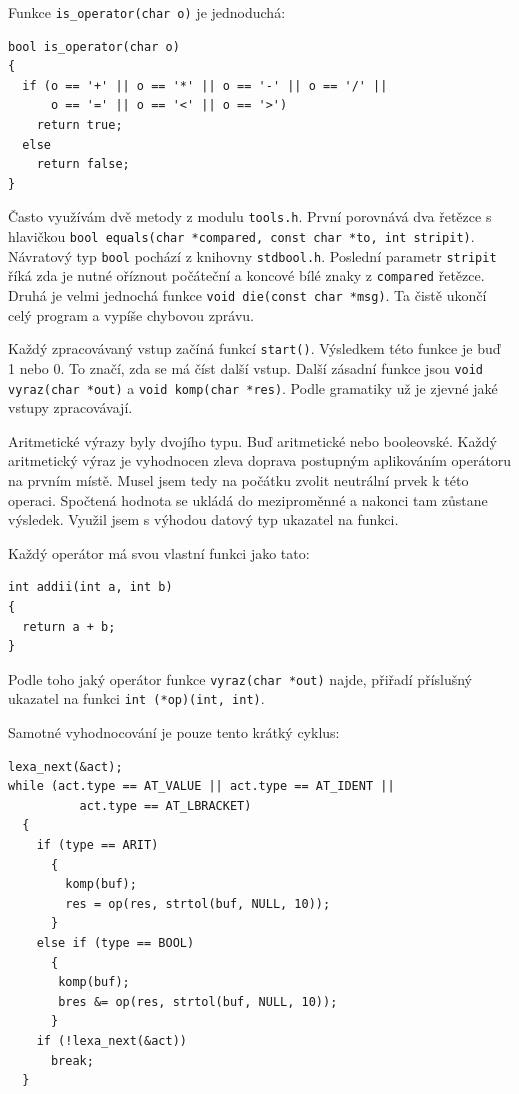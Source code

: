 \documentclass{article}
\begin{document}
Funkce \texttt{is\_operator(char o)} je jednoduchá:

\begin{lstlisting}
bool is_operator(char o)
{
  if (o == '+' || o == '*' || o == '-' || o == '/' ||
      o == '=' || o == '<' || o == '>')
    return true;
  else
    return false;
}
\end{lstlisting}

Často využívám dvě metody z modulu \texttt{tools.h}. První porovnává
dva řetězce s hlavičkou
\verb+bool equals(char *compared, const char *to, int stripit)+. Návratový
typ \texttt{bool} pochází z knihovny \texttt{stdbool.h}.
Poslední parametr \texttt{stripit} říká zda je nutné oříznout
počáteční a koncové bílé znaky z \texttt{compared} řetězce.
Druhá je velmi jednochá funkce \verb+void die(const char *msg)+. Ta čistě
ukončí celý program a vypíše chybovou zprávu.

Každý zpracovávaný vstup začíná funkcí \texttt{start()}.  Výsledkem
této funkce je buď 1 nebo 0. To značí, zda se má číst další vstup.
Další zásadní funkce jsou \verb+void vyraz(char *out)+ a
\verb+void komp(char *res)+. Podle gramatiky už je zjevné jaké
vstupy zpracovávají.

Aritmetické výrazy byly dvojího typu. Buď aritmetické nebo
booleovské. Každý aritmetický výraz je vyhodnocen zleva doprava
postupným aplikováním operátoru na prvním místě. Musel jsem
tedy na počátku zvolit neutrální prvek k této operaci. Spočtená
hodnota se ukládá do meziproměnné a nakonci tam zůstane výsledek.
Využil jsem s výhodou datový typ ukazatel na funkci.

Každý operátor má svou vlastní funkci jako tato:
\begin{lstlisting}
int addii(int a, int b)
{
  return a + b;
}
\end{lstlisting}

Podle toho jaký operátor funkce \texttt{vyraz(char *out)}
najde, přiřadí příslušný ukazatel na funkci \verb+int (*op)(int, int)+.

Samotné vyhodnocování je pouze tento krátký cyklus:
\begin{lstlisting}
lexa_next(&act);
while (act.type == AT_VALUE || act.type == AT_IDENT ||
          act.type == AT_LBRACKET)
  {
    if (type == ARIT)
      {
        komp(buf);
        res = op(res, strtol(buf, NULL, 10));
      }
    else if (type == BOOL)
      {
       komp(buf);
       bres &= op(res, strtol(buf, NULL, 10));
      }
    if (!lexa_next(&act))
      break;
  }
\end{lstlisting}
\end{document}
